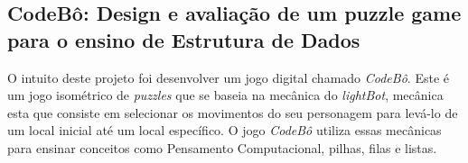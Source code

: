 \subsection{CodeBô: Design e avaliação de um puzzle game para o ensino de Estrutura de Dados}

O intuito deste projeto foi desenvolver um jogo digital chamado \textit{CodeBô}. Este é um jogo isométrico de \textit{puzzles} que se baseia na mecânica do \textit{lightBot}, mecânica esta que consiste em selecionar os movimentos do seu personagem para levá-lo de um local inicial até um local específico. O jogo \textit{CodeBô} utiliza essas mecânicas para ensinar conceitos como Pensamento Computacional, pilhas, filas e listas. \cite{de2025codebo}


